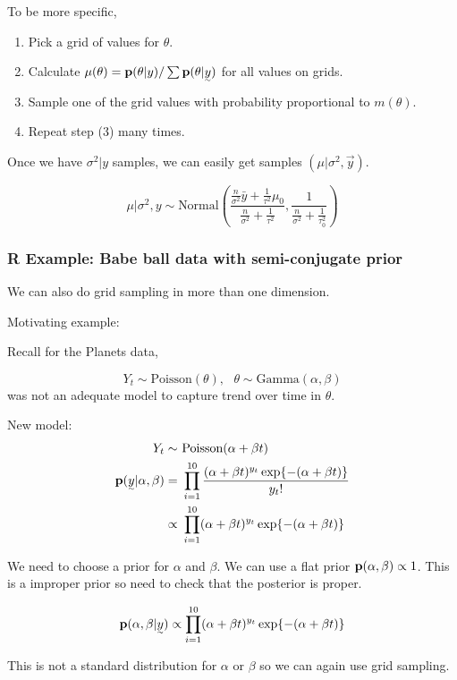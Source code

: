 To be more specific, 

\begin{enumerate}[(1)]
    \item Pick a grid of values for $\theta$.
    \item Calculate $\mu(\theta) = \p(\theta|y) / \sum \p(\theta| \vec{y})$ for all values on grids.
    \item Sample one of the grid values with probability proportional to $m(\theta)$.
    \item Repeat step (3) many times.
\end{enumerate}

Once we have $\sigma^2|y$ samples, we can easily get samples $(\mu| \sigma^2, \vec{y})$.

\[
\mu| \sigma^2, y \sim \text{Normal}(\frac{\frac{n}{\sigma^2} \bar{y} + \frac{1}{\tau^2} \mu_0}{\frac{n}{\sigma^2} + \frac{1}{\tau^2}}, \frac{1}{\frac{n}{\sigma^2} + \frac{1}{\tau_0^2}})
\]

\subsubsection{R Example: Babe ball data with semi-conjugate prior}

We can also do grid sampling in more than one dimension. 

Motivating example: 

Recall for the Planets data,

\[
Y_t \sim \text{Poisson}(\theta), ~~~ \theta \sim \text{Gamma}(\alpha, \beta) 
\]
was not an adequate model to capture trend over time in $\theta$.

New model:
\begin{align*}
    Y_t \sim&~ \text{Poisson}(\alpha + \beta t)\\
    \p(\vec{y}| \alpha, \beta) 
    =&~ \prod_{i=1}^{10} \frac{(\alpha + \beta t)^{y_t} \exp{-(\alpha + \beta t)}}{y_t!}\\
    \propto&~ \prod_{i=1}^{10} (\alpha + \beta t)^{y_t} \exp{-(\alpha + \beta t)}
\end{align*}

We need to choose a prior for $\alpha$ and $\beta$. We can use a flat prior ${\mathbf p}(\alpha, \beta) \propto 1$. This is a improper prior so need to check that the posterior is proper.

\[
\p(\alpha, \beta| \vec{y}) \propto \prod_{i=1}^{10} (\alpha + \beta t)^{y_t} \exp{-(\alpha + \beta t)}
\]

This is not a standard distribution for $\alpha$ or $\beta$ so we can again use grid sampling.

